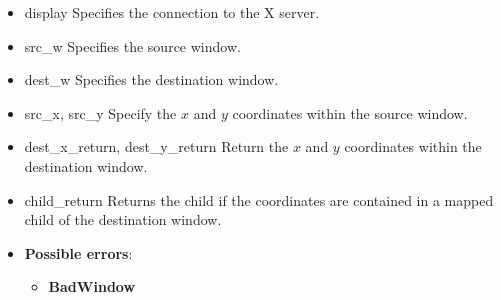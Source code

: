 \documentclass{report}
\begin{document}
\begin{itemize}
            \begin{itemize}
                \item display Specifies the connection to the X server.
                \item src\_w Specifies the source window.
                \item dest\_w Specifies the destination window.
                \item src\_x, src\_y Specify the $x$ and $y$ coordinates within the source window.
                \item dest\_x\_return, dest\_y\_return Return the $x$ and $y$ coordinates within the destination window.
                \item child\_return Returns the child if the coordinates are contained in a mapped child of the destination window.
            \end{itemize}

            \begin{itemize}
                \item \textbf{Possible errors}:
                    \begin{itemize}
                        \item \textbf{BadWindow}
                    \end{itemize}
            \end{itemize}


\end{itemize}
\end{document}
